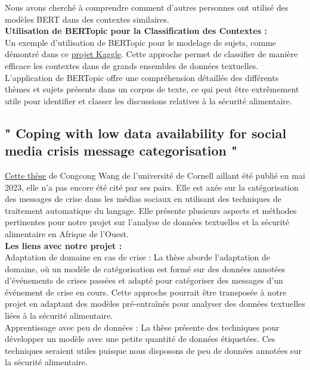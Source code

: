 \documentclass{article}
\begin{document}
Nous avons cherché à comprendre comment d'autres personnes ont utilisé des modèles BERT dans des contextes similaires. \\

\textbf{Utilisation de BERTopic pour la Classification des Contextes :} \\
Un exemple d'utilisation de BERTopic pour le modelage de sujets, comme démontré dans ce \href{https://www.kaggle.com/code/meetnagadia/topic-modeling-using-bertopic}{projet Kaggle}. Cette approche permet de classifier de manière efficace les contextes dans de grands ensembles de données textuelles. L'application de BERTopic offre une compréhension détaillée des différents thèmes et sujets présents dans un corpus de texte, ce qui peut être extrêmement utile pour identifier et classer les discussions relatives à la sécurité alimentaire.\\

\subsection{" Coping with low data availability for social media crisis message categorisation "}

\href{https://arxiv.org/abs/2305.17211}{Cette thèse} 
de Congcong Wang de l’université de Cornell aillant été publié en mai 2023, elle n’a pas encore été cité par ses pairs. Elle est axée sur la catégorisation des messages de crise dans les médias sociaux en utilisant des techniques de traitement automatique du langage. Elle présente plusieurs aspects et méthodes pertinentes pour notre projet sur l'analyse de données textuelles et la sécurité alimentaire en Afrique de l'Ouest. \\

\textbf{Les liens avec notre projet :} \\

Adaptation de domaine en cas de crise : La thèse aborde l'adaptation de domaine, où un modèle de catégorisation est formé sur des données annotées d'événements de crises passées et adapté pour catégoriser des messages d'un événement de crise en cours. Cette approche pourrait être transposée à notre projet en adaptant des modèles pré-entraînés pour analyser des données textuelles liées à la sécurité alimentaire. \\

Apprentissage avec peu de données : La thèse présente des techniques pour développer un modèle avec une petite quantité de données étiquetées. Ces techniques seraient utiles puisque nous disposons de peu de données annotées sur la sécurité alimentaire. \\
\end{document}
